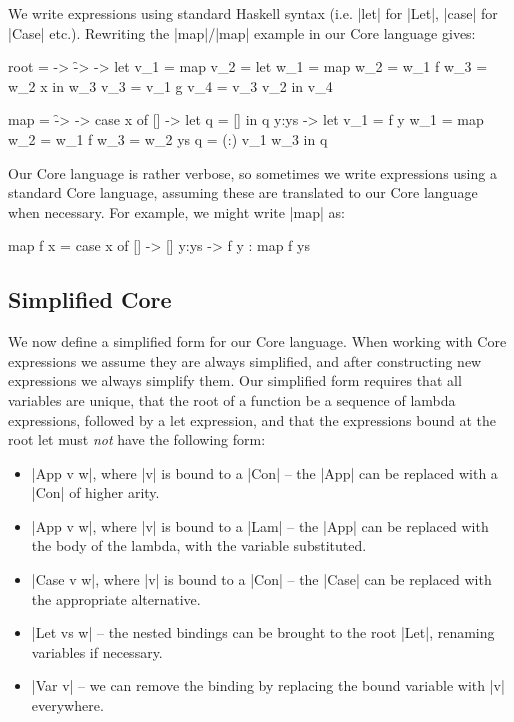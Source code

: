\documentclass[draft]{sigplanconf}
\begin{document}
We write expressions using standard Haskell syntax (i.e. |let| for |Let|, |case| for |Case| etc.). Rewriting the |map|/|map| example in our Core language gives:

\begin{code}
root = \g -> \f -> \x ->  let  v_1 =  map
                               v_2 =  let  w_1 = map
                                           w_2 = w_1 f
                                           w_3 = w_2 x
                                      in   w_3
                               v_3 =  v_1 g
                               v_4 =  v_3 v_2
                          in   v_4

map = \f -> \x -> case  x of
                        []    ->   let  q    = []
                                   in   q
                        y:ys  ->   let  v_1  = f y
                                        w_1  = map
                                        w_2  = w_1 f
                                        w_3  = w_2 ys
                                        q    = (:) v_1 w_3
                                   in   q
\end{code}

Our Core language is rather verbose, so sometimes we write expressions using a standard Core language, assuming these are translated to our Core language when necessary. For example, we might write |map| as:

\begin{code}
map f x = case  x of
                []    -> []
                y:ys  -> f y : map f ys
\end{code}

\subsection{Simplified Core}
\label{sec:simplify}

We now define a simplified form for our Core language. When working with Core expressions we assume they are always simplified, and after constructing new expressions we always simplify them. Our simplified form requires that all variables are unique, that the root of a function be a sequence of lambda expressions, followed by a let expression, and that the expressions bound at the root let must \textit{not} have the following form:

\begin{itemize}
\item |App v w|, where |v| is bound to a |Con| -- the |App| can be replaced with a |Con| of higher arity.
\item |App v w|, where |v| is bound to a |Lam| -- the |App| can be replaced with the body of the lambda, with the variable substituted.
\item |Case v w|, where |v| is bound to a |Con| -- the |Case| can be replaced with the appropriate alternative.
\item |Let vs w| -- the nested bindings can be brought to the root |Let|, renaming variables if necessary.
\item |Var v| -- we can remove the binding by replacing the bound variable with |v| everywhere.
\end{itemize}
\end{document}
